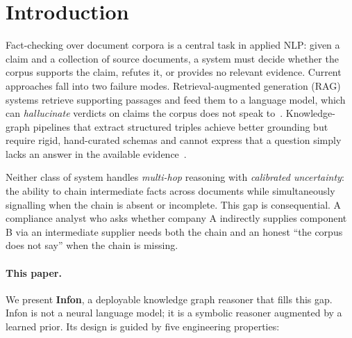 \section{Introduction}
\label{sec:introduction}

Fact-checking over document corpora is a central task in applied NLP: given a
claim and a collection of source documents, a system must decide whether the
corpus supports the claim, refutes it, or provides no relevant evidence.
Current approaches fall into two failure modes. Retrieval-augmented generation
(RAG) systems retrieve supporting passages and feed them to a language model,
which can \emph{hallucinate} verdicts on claims the corpus does not speak
to~\cite{lewis2020rag}. Knowledge-graph pipelines that extract structured
triples achieve better grounding but require rigid, hand-curated schemas and
cannot express that a question simply lacks an answer in the available
evidence~\cite{hogan2021kg}.

Neither class of system handles \emph{multi-hop} reasoning with
\emph{calibrated uncertainty}: the ability to chain intermediate facts across
documents while simultaneously signalling when the chain is absent or
incomplete. This gap is consequential. A compliance analyst who asks whether
company A indirectly supplies component B via an intermediate supplier needs
both the chain and an honest ``the corpus does not say'' when the chain is
missing.

\paragraph{This paper.}
We present \textbf{Infon}, a deployable knowledge graph reasoner that
fills this gap. Infon is not a neural language model; it is a symbolic
reasoner augmented by a learned prior. Its design is guided by five
engineering properties:

